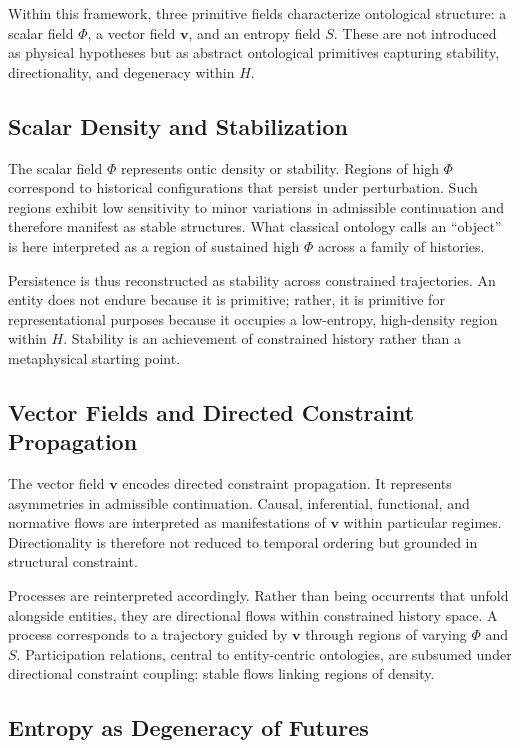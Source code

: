 \documentclass[12pt]{article}
\begin{document}
Within this framework, three primitive fields characterize ontological structure: a scalar field $\Phi$, a vector field $\mathbf{v}$, and an entropy field $S$. These are not introduced as physical hypotheses but as abstract ontological primitives capturing stability, directionality, and degeneracy within $H$.

\subsection{Scalar Density and Stabilization}

The scalar field $\Phi$ represents ontic density or stability. Regions of high $\Phi$ correspond to historical configurations that persist under perturbation. Such regions exhibit low sensitivity to minor variations in admissible continuation and therefore manifest as stable structures. What classical ontology calls an ``object'' is here interpreted as a region of sustained high $\Phi$ across a family of histories.

Persistence is thus reconstructed as stability across constrained trajectories. An entity does not endure because it is primitive; rather, it is primitive for representational purposes because it occupies a low-entropy, high-density region within $H$. Stability is an achievement of constrained history rather than a metaphysical starting point.

\subsection{Vector Fields and Directed Constraint Propagation}

The vector field $\mathbf{v}$ encodes directed constraint propagation. It represents asymmetries in admissible continuation. Causal, inferential, functional, and normative flows are interpreted as manifestations of $\mathbf{v}$ within particular regimes. Directionality is therefore not reduced to temporal ordering but grounded in structural constraint.

Processes are reinterpreted accordingly. Rather than being occurrents that unfold alongside entities, they are directional flows within constrained history space. A process corresponds to a trajectory guided by $\mathbf{v}$ through regions of varying $\Phi$ and $S$. Participation relations, central to entity-centric ontologies, are subsumed under directional constraint coupling: stable flows linking regions of density.

\subsection{Entropy as Degeneracy of Futures}
\end{document}
